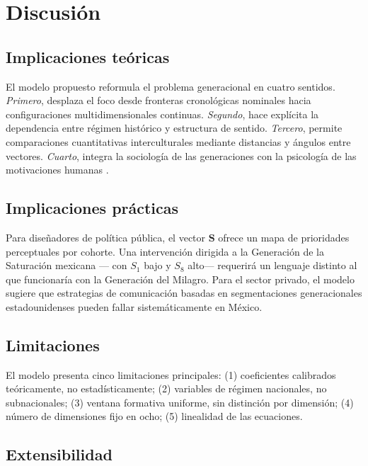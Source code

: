 \documentclass[conference,spanish]{IEEEtran}
\begin{document}
\section{Discusión}
\label{sec:discusion}

\subsection{Implicaciones teóricas}

El modelo propuesto reformula el problema generacional en cuatro sentidos. \textit{Primero}, desplaza el foco desde fronteras cronológicas nominales hacia configuraciones multidimensionales continuas. \textit{Segundo}, hace explícita la dependencia entre régimen histórico y estructura de sentido. \textit{Tercero}, permite comparaciones cuantitativas interculturales mediante distancias y ángulos entre vectores. \textit{Cuarto}, integra la sociología de las generaciones con la psicología de las motivaciones humanas \cite{maslow1943, inglehart1977}.

\subsection{Implicaciones prácticas}

Para diseñadores de política pública, el vector $\mathbf{S}$ ofrece un mapa de prioridades perceptuales por cohorte. Una intervención dirigida a la Generación de la Saturación mexicana --- con $S_1$ bajo y $S_8$ alto--- requerirá un lenguaje distinto al que funcionaría con la Generación del Milagro. Para el sector privado, el modelo sugiere que estrategias de comunicación basadas en segmentaciones generacionales estadounidenses pueden fallar sistemáticamente en México.

\subsection{Limitaciones}

El modelo presenta cinco limitaciones principales: (1) coeficientes calibrados teóricamente, no estadísticamente; (2) variables de régimen nacionales, no subnacionales; (3) ventana formativa uniforme, sin distinción por dimensión; (4) número de dimensiones fijo en ocho; (5) linealidad de las ecuaciones.

\subsection{Extensibilidad}
\end{document}
